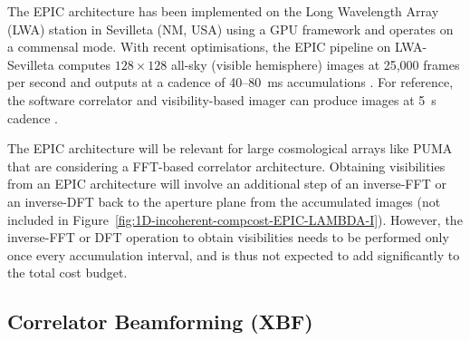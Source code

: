 \documentclass[
  journal=pasa,
  manuscript=article-type,
  year=2020,
  volume=37,
]{cup-journal}
\begin{document}
The EPIC architecture has been implemented on the Long Wavelength Array (LWA) station in Sevilleta (NM, USA) \citep{Kent+2019,Kent+2020,Krishnan+2023} using a GPU framework and operates on a commensal mode. With recent optimisations, the EPIC pipeline on LWA-Sevilleta computes $128\times 128$ all-sky (visible hemisphere) images at 25,000 frames per second and outputs at a cadence of 40--80~ms accumulations \citep{Reddy+2024}. For reference, the software correlator and visibility-based imager can produce images at 5~s cadence \citep{Taylor+2012}.

The EPIC architecture will be relevant for large cosmological arrays like PUMA that are considering a FFT-based correlator architecture. Obtaining visibilities from an EPIC architecture will involve an additional step of an inverse-FFT or an inverse-DFT back to the aperture plane from the accumulated images (not included in Figure~\ref{fig:1D-incoherent-compcost-EPIC-LAMBDA-I}). However, the inverse-FFT or DFT operation to obtain visibilities needs to be performed only once every accumulation interval, and is thus not expected to add significantly to the total cost budget.

\subsection{Correlator Beamforming (XBF)}
\end{document}
